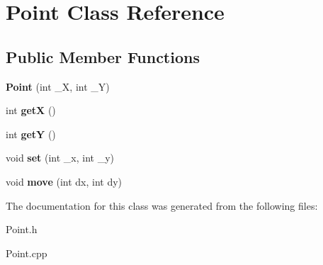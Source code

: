 \hypertarget{class_point}{}\section{Point Class Reference}
\label{class_point}
\subsection*{Public Member Functions}
\begin{DoxyCompactItemize}
\item 
{\bfseries Point} (int \+\_\+X, int \+\_\+Y)\hypertarget{class_point_a581ce64df5e5e16cf9e31bdbf5e72bef}{}\label{class_point_a581ce64df5e5e16cf9e31bdbf5e72bef}

\item 
int {\bfseries getX} ()\hypertarget{class_point_a0b82a4aa9614c11854abc507d89a70a9}{}\label{class_point_a0b82a4aa9614c11854abc507d89a70a9}

\item 
int {\bfseries getY} ()\hypertarget{class_point_a3770f321c49dfe7ca463900fddc2e2bc}{}\label{class_point_a3770f321c49dfe7ca463900fddc2e2bc}

\item 
void {\bfseries set} (int \+\_\+x, int \+\_\+y)\hypertarget{class_point_af4f5b86266c49ca7daeaad256d91ce61}{}\label{class_point_af4f5b86266c49ca7daeaad256d91ce61}

\item 
void {\bfseries move} (int dx, int dy)\hypertarget{class_point_a6a43ccfedf9b1b3184388641a7e4e602}{}\label{class_point_a6a43ccfedf9b1b3184388641a7e4e602}

\end{DoxyCompactItemize}


The documentation for this class was generated from the following files\+:\begin{DoxyCompactItemize}
\item 
Point.\+h\item 
Point.\+cpp\end{DoxyCompactItemize}
